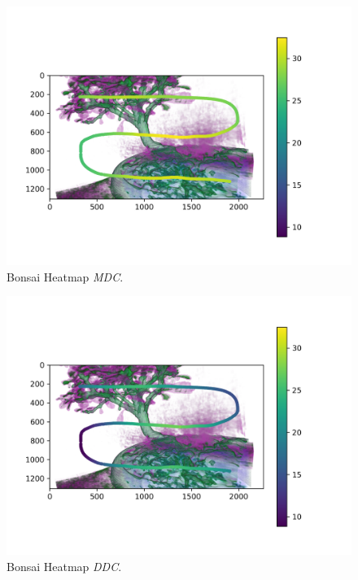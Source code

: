 \begin{figure}
	\centering
	\includegraphics[width=1\textwidth]{../../Grafiken/results/performance/bonsai/ms_data_mdc_heatmap.png}
	\caption{Bonsai Heatmap \emph{MDC}.}
	\label{fig::res::pf::hm_bs_mdc}
\end{figure}
\begin{figure}
	\centering
	\includegraphics[width=1\textwidth]{../../Grafiken/results/performance/bonsai/ms_data_ddc_heatmap.png}
	\caption{Bonsai Heatmap \emph{DDC}.}
	\label{fig::res::pf::hm_bs_ddc}
\end{figure}

